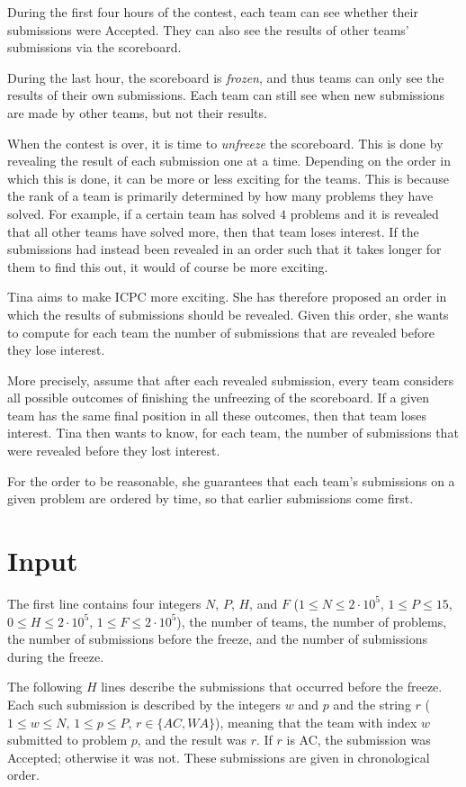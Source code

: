 During the first four hours of the contest, each team can see whether their submissions were Accepted.
They can also see the results of other teams' submissions via the scoreboard.

During the last hour, the scoreboard is \textit{frozen}, and thus teams can only see the results
of their own submissions.
Each team can still see when new submissions are made by other teams, but not their results.

When the contest is over, it is time to \textit{unfreeze} the scoreboard.
This is done by revealing the result of each submission one at a time.
Depending on the order in which this is done, it can be more or less exciting for the teams.
This is because the rank of a team is primarily determined by how many problems they have solved.
For example, if a certain team has solved $4$ problems and it is revealed that all other teams
have solved more, then that team loses interest.
If the submissions had instead been revealed in an order such that it takes longer for them to
find this out, it would of course be more exciting.

Tina aims to make ICPC more exciting.
She has therefore proposed an order in which the results of submissions should be revealed.
Given this order, she wants to compute for each team the number of submissions that are revealed
before they lose interest.

More precisely, assume that after each revealed submission, every team considers all possible
outcomes of finishing the unfreezing of the scoreboard.
If a given team has the same final position in all these outcomes, then that team loses interest.
Tina then wants to know, for each team, the number of submissions that were revealed before they
lost interest.

For the order to be reasonable, she guarantees that each team's submissions on a given problem
are ordered by time, so that earlier submissions come first.

\section*{Input}
The first line contains four integers $N$, $P$, $H$, and $F$
($1 \leq N \leq 2 \cdot 10^5$, $1 \leq P \leq 15$, $0 \leq H \leq 2 \cdot 10^5$, $1 \leq F \leq 2 \cdot 10^5$),
the number of teams, the number of problems, the number of submissions before the freeze,
and the number of submissions during the freeze.

The following $H$ lines describe the submissions that occurred before the freeze.
Each such submission is described by the integers $w$ and $p$ and the string $r$
($1 \leq w \leq N$, $1 \leq p \leq P$, $r \in \{AC, WA\}$),
meaning that the team with index $w$ submitted to problem $p$, and the result was $r$.
If $r$ is AC, the submission was Accepted; otherwise it was not.
These submissions are given in chronological order.

